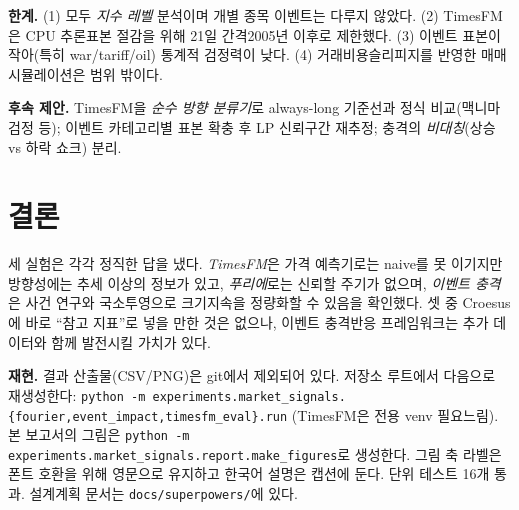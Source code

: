 \documentclass[11pt]{article}
\begin{document}
\textbf{한계.} (1) 모두 \emph{지수 레벨} 분석이며 개별 종목 이벤트는 다루지 않았다. (2) TimesFM은 CPU 추론\textperiodcentered 표본 절감을 위해 21일 간격\textperiodcentered 2005년 이후로 제한했다. (3) 이벤트 표본이 작아(특히 war/tariff/oil) 통계적 검정력이 낮다. (4) 거래비용\textperiodcentered 슬리피지를 반영한 매매 시뮬레이션은 범위 밖이다.

\textbf{후속 제안.} TimesFM을 \emph{순수 방향 분류기}로 always-long 기준선과 정식 비교(맥니마 검정 등); 이벤트 카테고리별 표본 확충 후 LP 신뢰구간 재추정; 충격의 \emph{비대칭}(상승 vs 하락 쇼크) 분리.

\section{결론}
세 실험은 각각 정직한 답을 냈다. \emph{TimesFM}은 가격 예측기로는 naive를 못 이기지만 방향성에는 추세 이상의 정보가 있고, \emph{푸리에}로는 신뢰할 주기가 없으며, \emph{이벤트 충격}은 사건 연구와 국소투영으로 크기\textperiodcentered 지속을 정량화할 수 있음을 확인했다. 셋 중 Croesus에 바로 ``참고 지표''로 넣을 만한 것은 없으나, 이벤트 충격반응 프레임워크는 추가 데이터와 함께 발전시킬 가치가 있다.

\vfill
\footnotesize\noindent\textbf{재현.} 결과 산출물(CSV/PNG)은 git에서 제외되어 있다. 저장소 루트에서 다음으로 재생성한다: \texttt{python -m experiments.market\_signals.\{fourier,event\_impact,timesfm\_eval\}.run} (TimesFM은 전용 venv 필요\textperiodcentered 느림). 본 보고서의 그림은 \texttt{python -m experiments.market\_signals.report.make\_figures}로 생성한다. 그림 축 라벨은 폰트 호환을 위해 영문으로 유지하고 한국어 설명은 캡션에 둔다. 단위 테스트 16개 통과. 설계\textperiodcentered 계획 문서는 \texttt{docs/superpowers/}에 있다.
\end{document}
